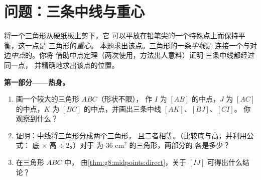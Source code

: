 \section{问题：三条中线与重心}

\begin{problem}
\label{pb:g8:midpoints:1}
将一个三角形从硬纸板上剪下，它
可以平放在铅笔尖的一个特殊点上而保持平衡，这一点是
三角形的\emph{重心}。
本题求出该点。三角形的一条\emph{中线}是
连接一个与对边\emph{中点}的。你将
借助中点定理（两次使用，方法出人意料）证明
三条中线都经过同一点，
并精确地求出该点的位置。

\medskip
\noindent\textbf{第一部分——热身。}
\begin{enumerate}
  \item 画一个较大的三角形 $ABC$（形状不限），
        作 $I$ 为 $[AB]$ 的中点，$J$ 为 $[AC]$ 的中点，$K$ 为
        $[BC]$ 的中点，并画出三条中线 $[AK]$、$[BJ]$、$[CI]$。
        你观察到什么？
  \item 证明：中线将三角形分成两个三角形，
        且二者相等。（比较底与高，并利用公式：
        底 $\times$ 高 $\div\ 2$。）对于
        为 $36$ cm$^2$ 的三角形，两部分的
        各是多少？
  \item 在三角形 $ABC$ 中，
        由\cref{thm:g8:midpoints:direct}，关于
        $[IJ]$ 可得出什么结论？
\end{enumerate}


\end{problem}
